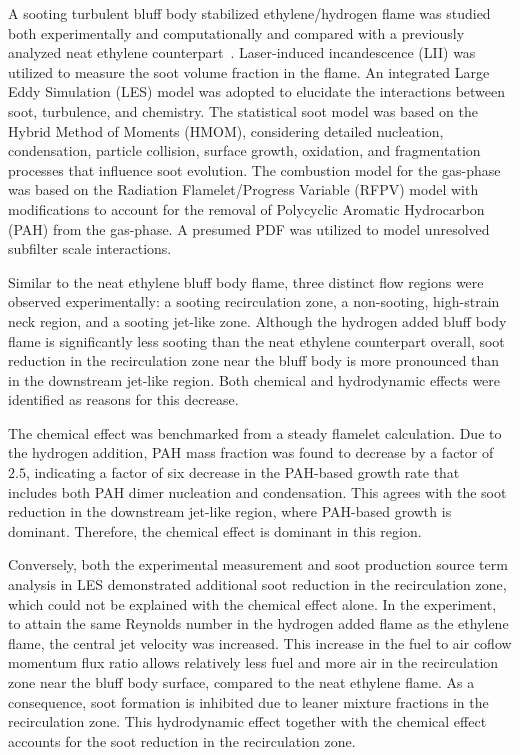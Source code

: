 \documentclass[review,3p,times]{elsarticle}
\begin{document}
A sooting turbulent bluff body stabilized ethylene/hydrogen flame was studied both experimentally and computationally and compared with a previously analyzed neat ethylene counterpart~\cite{mueller13}.  Laser-induced incandescence (LII) was utilized to measure the soot volume fraction in the flame.  An integrated Large Eddy Simulation (LES) model was adopted to elucidate the interactions between soot, turbulence, and chemistry.  The statistical soot model was based on the Hybrid Method of Moments (HMOM), considering detailed nucleation, condensation, particle collision, surface growth, oxidation, and fragmentation processes that influence soot evolution.  The combustion model for the gas-phase was based on the Radiation Flamelet/Progress Variable (RFPV) model with modifications to account for the removal of Polycyclic Aromatic Hydrocarbon (PAH) from the gas-phase.  A presumed PDF was utilized to model unresolved subfilter scale interactions.

Similar to the neat ethylene bluff body flame, three distinct flow regions were observed experimentally: a sooting recirculation zone, a non-sooting, high-strain neck region, and a sooting jet-like zone.  Although the hydrogen added bluff body flame is significantly less sooting than the neat ethylene counterpart overall, soot reduction in the recirculation zone near the bluff body is more pronounced than in the downstream jet-like region.  Both chemical and hydrodynamic effects were identified as reasons for this decrease.

The chemical effect was benchmarked from a steady flamelet calculation.  Due to the hydrogen addition, PAH mass fraction was found to decrease by a factor of $2.5$, indicating a factor of six decrease in the PAH-based growth rate that includes both PAH dimer nucleation and condensation.  This agrees with the soot reduction in the downstream jet-like region, where PAH-based growth is dominant.  Therefore, the chemical effect is dominant in this region.

Conversely, both the experimental measurement and soot production source term analysis in LES demonstrated additional soot reduction in the recirculation zone, which could not be explained with the chemical effect alone.  In the experiment, to attain the same Reynolds number in the hydrogen added flame as the ethylene flame, the central jet velocity was increased.  This increase in the fuel to air coflow momentum flux ratio allows relatively less fuel and more air in the recirculation zone near the bluff body surface, compared to the neat ethylene flame.  As a consequence, soot formation is inhibited due to leaner mixture fractions in the recirculation zone.  This hydrodynamic effect together with the chemical effect accounts for the soot reduction in the recirculation zone.    
\end{document}
